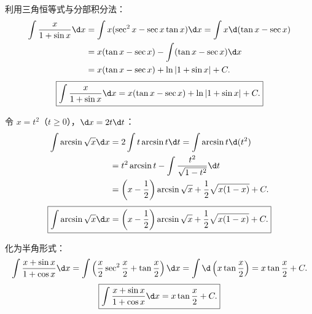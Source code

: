 \begin{solution}

    利用三角恒等式与分部积分法：
    \begin{equation}
        \begin{aligned}
            \int \frac{x}{1 + \sin x} \d x & = \int x (\sec^2 x - \sec x \tan x) \d x = \int x \d(\tan x - \sec x) \\
                                           & = x(\tan x - \sec x) - \int (\tan x - \sec x) \d x                    \\
                                           & = x(\tan x - \sec x) + \ln|1 + \sin x| + C.
        \end{aligned}
    \end{equation}
    \begin{equation}
        \boxed{\int \frac{x}{1 + \sin x} \d x = x(\tan x - \sec x) + \ln|1 + \sin x| + C.}
    \end{equation}


    令 $x = t^2$（$t \geqslant 0$），$\d x = 2t \d t$：
    \begin{equation}
        \begin{aligned}
            \int \arcsin\sqrt{x} \d x & = 2\int t \arcsin t \d t = \int \arcsin t \d(t^2)                                 \\
                                      & = t^2 \arcsin t - \int \frac{t^2}{\sqrt{1 - t^2}} \d t                            \\
                                      & = \left( x - \frac{1}{2} \right)\arcsin\sqrt{x} + \frac{1}{2}\sqrt{x(1 - x)} + C.
        \end{aligned}
    \end{equation}
    \begin{equation}
        \boxed{\int \arcsin\sqrt{x} \d x = \left( x - \frac{1}{2} \right)\arcsin\sqrt{x} + \frac{1}{2}\sqrt{x(1 - x)} + C.}
    \end{equation}


    化为半角形式：
    \begin{equation}
        \int \frac{x + \sin x}{1 + \cos x} \d x = \int \left( \frac{x}{2}\sec^2\frac{x}{2} + \tan\frac{x}{2} \right) \d x = \int \d\left( x \tan\frac{x}{2} \right) = x \tan\frac{x}{2} + C.
    \end{equation}
    \begin{equation}
        \boxed{\int \frac{x + \sin x}{1 + \cos x} \d x = x \tan\frac{x}{2} + C.}
    \end{equation}


\end{solution}
